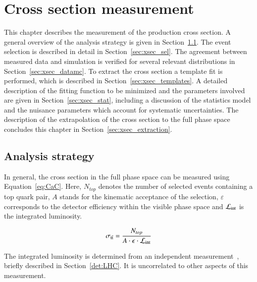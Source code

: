 \chapter{Cross section measurement}
\label{sec:xsec}

This chapter describes the measurement of the \ttbar production cross section.
A general overview of the analysis strategy is given in Section~\ref{sec:xsec_strat}.
The event selection is described in detail in Section~\ref{sec:xsec_sel}.
The agreement between measured data and simulation is verified for several relevant distributions in Section~\ref{sec:xsec_datamc}.
To extract the cross section a template fit is performed, which is described in Section~\ref{sec:xsec_templates}.
A detailed description of the fitting function to be minimized and the parameters involved are given in Section~\ref{sec:xsec_stat},
including a discussion of the statistics model and the nuisance parameters which account for systematic uncertainties.
The description of the extrapolation of the cross section to the full phase space concludes this chapter in Section~\ref{sec:xsec_extraction}.

\section{Analysis strategy}
\label{sec:xsec_strat}

In general, the cross section in the full phase space can be measured using Equation~\ref{eq:CaC}. Here, $N_{top}$ denotes the number of selected events containing a top quark pair, $A$ stands for the kinematic acceptance of the selection,
$\varepsilon$ corresponds to the  detector efficiency within the visible phase space and $\mathcal{L}_\mathrm{int}$ is the integrated luminosity.


\begin{equation}
\sigma_{\mathrm{t}\bar{\mathrm{t}}} = \frac{N_{top}}{A \cdot \epsilon \cdot \mathcal{L}_\mathrm{int} }
\label{eq:CaC}
\end{equation} 

The integrated luminosity is determined from an independent measurement~\cite{CMS-PAS-LUM-17-001}, briefly described in Section~\ref{det:LHC}. It is uncorrelated to other aspects of this measurement.

